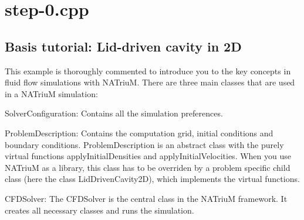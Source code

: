 \hypertarget{step-0_8cpp-example}{\section{step-\/0.\-cpp}
}
\hypertarget{step-0.cpp_sec_intro}{}\subsection{Basis tutorial\-: Lid-\/driven cavity in 2\-D}\label{step-0.cpp_sec_intro}
This example is thoroughly commented to introduce you to the key concepts in fluid flow simulations with N\-A\-Triu\-M. There are three main classes that are used in a N\-A\-Triu\-M simulation\-:
\begin{DoxyItemize}
\item Solver\-Configuration\-: Contains all the simulation preferences.
\item Problem\-Description\-: Contains the computation grid, initial conditions and boundary conditions. Problem\-Description is an abstract class with the purely virtual functions apply\-Initial\-Densities and apply\-Initial\-Velocities. When you use N\-A\-Triu\-M as a library, this class has to be overriden by a problem specific child class (here the class Lid\-Driven\-Cavity2\-D), which implements the virtual functions.
\item C\-F\-D\-Solver\-: The C\-F\-D\-Solver is the central class in the N\-A\-Triu\-M framework. It creates all necessary classes and runs the simulation.
\end{DoxyItemize}

